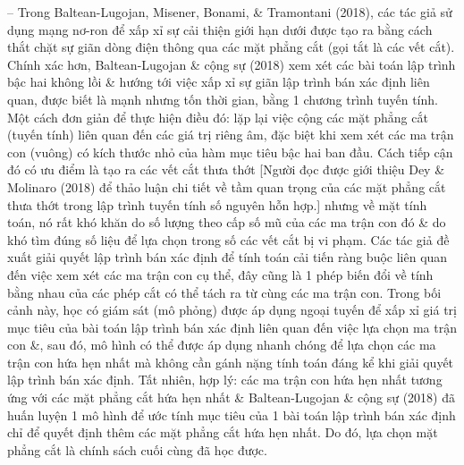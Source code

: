 \documentclass{article}
\begin{document}
\begin{itemize}
\begin{itemize}
\begin{itemize}
            -- Trong Baltean-Lugojan, Misener, Bonami, \& Tramontani (2018), các tác giả sử dụng mạng nơ-ron để xấp xỉ sự cải thiện giới hạn dưới được tạo ra bằng cách thắt chặt sự giãn dòng điện thông qua các mặt phẳng cắt (gọi tắt là các vết cắt). Chính xác hơn, Baltean-Lugojan \& cộng sự (2018) xem xét các bài toán lập trình bậc hai không lồi \& hướng tới việc xấp xỉ sự giãn lập trình bán xác định liên quan, được biết là mạnh nhưng tốn thời gian, bằng 1 chương trình tuyến tính. Một cách đơn giản để thực hiện điều đó: lặp lại việc cộng các mặt phẳng cắt (tuyến tính) liên quan đến các giá trị riêng âm, đặc biệt khi xem xét các ma trận con (vuông) có kích thước nhỏ của hàm mục tiêu bậc hai ban đầu. Cách tiếp cận đó có ưu điểm là tạo ra các vết cắt thưa thớt [Người đọc được giới thiệu Dey \& Molinaro (2018) để thảo luận chi tiết về tầm quan trọng của các mặt phẳng cắt thưa thớt trong lập trình tuyến tính số nguyên hỗn hợp.] nhưng về mặt tính toán, nó rất khó khăn do số lượng theo cấp số mũ của các ma trận con đó \& do khó tìm đúng số liệu để lựa chọn trong số các vết cắt bị vi phạm. Các tác giả đề xuất giải quyết lập trình bán xác định để tính toán cải tiến ràng buộc liên quan đến việc xem xét các ma trận con cụ thể, đây cũng là 1 phép biến đổi về tính bằng nhau của các phép cắt có thể tách ra từ cùng các ma trận con. Trong bối cảnh này, học có giám sát (mô phỏng) được áp dụng ngoại tuyến để xấp xỉ giá trị mục tiêu của bài toán lập trình bán xác định liên quan đến việc lựa chọn ma trận con \&, sau đó, mô hình có thể được áp dụng nhanh chóng để lựa chọn các ma trận con hứa hẹn nhất mà không cần gánh nặng tính toán đáng kể khi giải quyết lập trình bán xác định. Tất nhiên, hợp lý: các ma trận con hứa hẹn nhất tương ứng với các mặt phẳng cắt hứa hẹn nhất \& Baltean-Lugojan \& cộng sự (2018) đã huấn luyện 1 mô hình để ước tính mục tiêu của 1 bài toán lập trình bán xác định chỉ để quyết định thêm các mặt phẳng cắt hứa hẹn nhất. Do đó, lựa chọn mặt phẳng cắt là chính sách cuối cùng đã học được.


\end{itemize}
\end{itemize}
\end{itemize}
\end{document}
